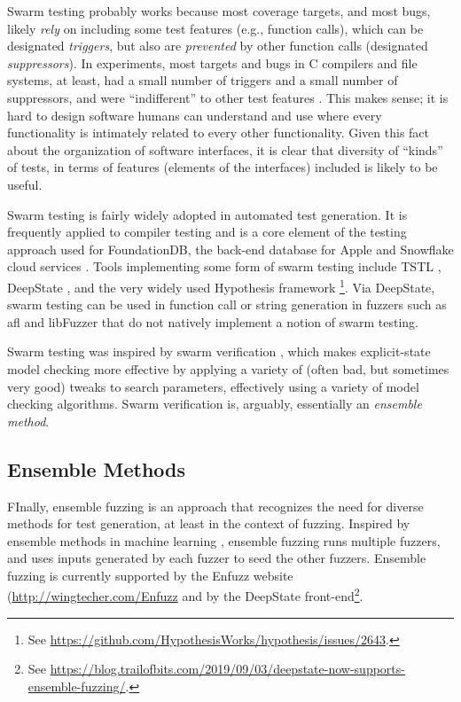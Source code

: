 \documentclass[sigplan,review]{acmart}
\begin{document}
Swarm testing probably works because most coverage targets, and most
bugs, likely \emph{rely} on including some test features (e.g.,
function calls), which can be designated \emph{triggers}, but also are
\emph{prevented} by other function calls (designated
\emph{suppressors}).  In experiments, most targets and bugs in C
compilers and file systems, at least, had a small number of triggers
and a small number of suppressors, and were ``indifferent'' to other
test features \cite{groce2013help}.  This makes sense; it is hard to
design software humans can understand and use where every
functionality is intimately related to every other functionality.
Given this fact about the organization of software interfaces, it is
clear that diversity of ``kinds'' of tests, in terms of features
(elements of the interfaces) included is likely to be useful.

Swarm testing is fairly widely adopted in automated test generation.  It is frequently
applied to compiler testing \cite{le2014compiler,dewey2015fuzzing} and
is a core element of the testing approach used for FoundationDB, the
back-end database for Apple and Snowflake cloud services
\cite{zhou2021foundationdb}.  Tools implementing some form of swarm
testing include TSTL \cite{tstlsttt}, DeepState \cite{goodman2018deepstate}, and the very widely used Hypothesis
framework \cite{hypothesis}\footnote{See \url{https://github.com/HypothesisWorks/hypothesis/issues/2643}.}.
Via DeepState, swarm testing can be used in function call or
string generation in fuzzers such as afl and libFuzzer that do not
natively implement a notion of swarm testing.

Swarm testing was inspired by swarm verification \cite{swarmIEEE},
which makes explicit-state model checking more effective by applying a
variety of (often bad, but sometimes very good) tweaks to search
parameters, effectively using a variety of model checking algorithms.
Swarm verification is, arguably, essentially an \emph{ensemble method}.

\subsection{Ensemble Methods}

FInally, ensemble fuzzing \cite{chen2019enfuzz} is an approach that recognizes the need for
diverse methods for test generation, at least in the context of
fuzzing.   Inspired by ensemble methods in machine learning \cite{dietterich2002ensemble},
ensemble fuzzing runs multiple fuzzers, and uses inputs generated by
each fuzzer to seed the other fuzzers.  Ensemble fuzzing is currently
supported by the Enfuzz website  (\url{http://wingtecher.com/Enfuzz}
and by the DeepState front-end\footnote{See
\url{https://blog.trailofbits.com/2019/09/03/deepstate-now-supports-ensemble-fuzzing/}.}.
\end{document}
